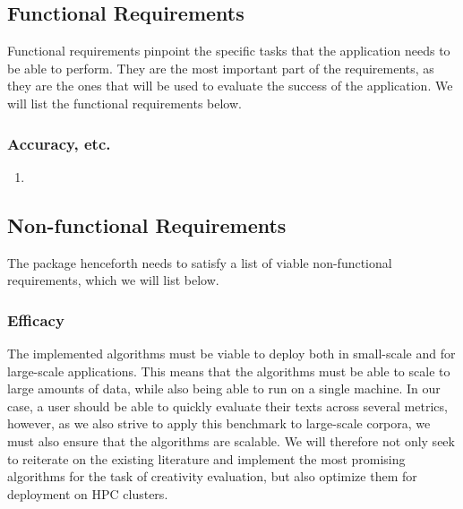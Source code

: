 \subsection{Functional Requirements}
Functional requirements pinpoint the specific tasks that the application needs to be able to perform. They are the most important part of the requirements, as they are the ones that will be used to evaluate the success of the application. We will list the functional requirements below.
\subsubsection{Accuracy, etc.}

\begin{enumerate}
    \item 
\end{enumerate}




\subsection{Non-functional Requirements}
The package henceforth needs to satisfy a list of viable non-functional requirements, which we will list below.
\subsubsection{Efficacy}
The implemented algorithms must be viable to deploy both in small-scale and for large-scale applications. This means that the algorithms must be able to scale to large amounts of data, while also being able to run on a single machine. In our case, a user should be able to quickly evaluate their texts across several metrics, however, as we also strive to apply this benchmark to large-scale corpora, we must also ensure that the algorithms are scalable.
We will therefore not only seek to reiterate on the existing literature and implement the most promising algorithms for the task of creativity evaluation, but also optimize them for deployment on HPC clusters. 
